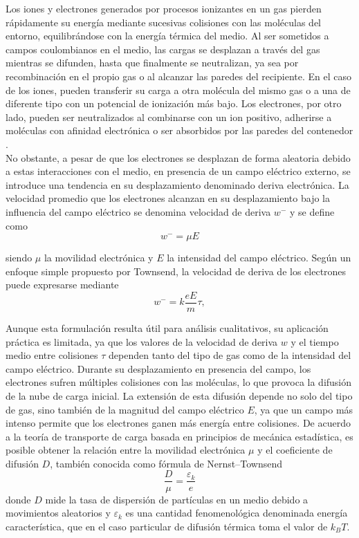 \documentclass{report}
\begin{document}
\noindent Los iones y electrones generados por procesos ionizantes en un gas pierden rápidamente su energía mediante sucesivas colisiones con las moléculas del entorno, equilibrándose con la energía térmica del medio. Al ser sometidos a campos coulombianos en el medio, las cargas se desplazan a través del gas mientras se difunden, hasta que finalmente se neutralizan, ya sea por recombinación en el propio gas o al alcanzar las paredes del recipiente. En el caso de los iones, pueden transferir su carga a otra molécula del mismo gas o a una de diferente tipo con un potencial de ionización más bajo. Los electrones, por otro lado, pueden ser neutralizados al combinarse con un ion positivo, adherirse a moléculas con afinidad electrónica o ser absorbidos por las paredes del contenedor \cite{loeb2023electrical}.\\

\noindent No obstante, a pesar de que los electrones se desplazan de forma aleatoria debido a estas interacciones con el medio, en presencia de un campo eléctrico externo, se introduce una tendencia en su desplazamiento denominado deriva electrónica. La velocidad promedio que los electrones alcanzan en su desplazamiento bajo la influencia del campo eléctrico se denomina velocidad de deriva $w^{-}$ y se define como 
\begin{equation}
    w^{-} = \mu E
\end{equation}

\noindent siendo $\mu$ la movilidad electrónica y $E$ la intensidad del campo eléctrico. Según un enfoque simple propuesto por Townsend\cite{townsend1901xvii}, la velocidad de deriva de los electrones puede expresarse mediante 
\begin{equation}
    w^{-}=k \frac{e E}{m} \tau,
\end{equation}

\noindent Aunque esta formulación resulta útil para análisis cualitativos, su aplicación práctica es limitada, ya que los valores de la velocidad de deriva $w$ y el tiempo medio entre colisiones $\tau$ dependen tanto del tipo de gas como de la intensidad del campo eléctrico. Durante su desplazamiento en presencia del campo, los electrones sufren múltiples colisiones con las moléculas, lo que provoca la difusión de la nube de carga inicial. La extensión de esta difusión depende no solo del tipo de gas, sino también de la magnitud del campo eléctrico $E$, ya que un campo más intenso permite que los electrones ganen más energía entre colisiones. De acuerdo a la teoría de transporte de carga basada en principios de mecánica estadística, es posible obtener la relación entre la movilidad electrónica $\mu$ y el coeficiente de difusión $D$, también conocida como fórmula de Nernst–Townsend \cite{loeb1947mechanism}
\begin{equation}
    \frac{D}{\mu}=\frac{\varepsilon_k}{e}
\end{equation}
\noindent donde $D$ mide la tasa de dispersión de partículas en un medio debido a movimientos aleatorios y $\varepsilon_k$ es una cantidad fenomenológica denominada energía característica, que en el caso particular de difusión térmica toma el valor de $k_{B} T$.\\
\end{document}
